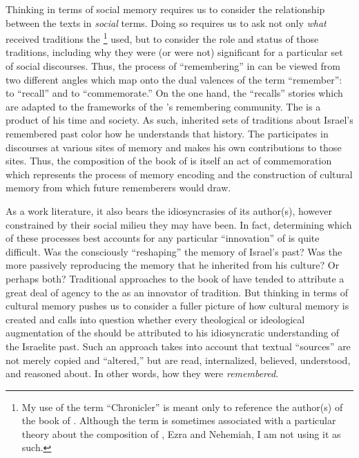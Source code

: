 Thinking in terms of social memory requires us to consider the relationship between the texts in \emph{social} terms. Doing so requires us to ask not only \emph{what} received traditions the \chronicler%
    \footnote{My use of the term ``Chronicler'' is meant only to reference the author(s) of the book of \chronicles. Although the term is sometimes associated with a particular theory about the composition of \chronicles, Ezra and Nehemiah, I am not using it as such.}
used, but to consider the role and status of those traditions, including why they were (or were not) significant for a particular set of social discourses. Thus, the process of ``remembering'' in \chronicles can be viewed from two different angles which map onto the dual valences of the term ``remember'': to ``recall'' and to ``commemorate.'' On the one hand, the \chronicler ``recalls'' stories which are adapted to the frameworks of the \chronicler's remembering community. The \chronicler is a product of his time and society. As such, inherited sets of traditions about Israel's remembered past color how he understands that history. The \chronicler participates in discourses at various sites of memory and makes his own contributions to those sites. Thus, the composition of the book of \chronicles is itself an act of commemoration which represents the process of memory encoding and the construction of cultural memory from which future rememberers would draw.

As a work literature, it also bears the idiosyncrasies of its author(s), however constrained by their social milieu they may have been. In fact, determining which of these processes best accounts for any particular ``innovation'' of \chronicles is quite difficult. Was the \chronicler consciously ``reshaping'' the memory of Israel's past? Was the \chronicler more passively reproducing the memory that he inherited from his culture? Or perhaps both? Traditional approaches to the book of \chronicles have tended to attribute a great deal of agency to the \chronicler as an innovator of tradition. But thinking in terms of cultural memory pushes us to consider a fuller picture of how cultural memory is created and calls into question whether every theological or ideological augmentation of the \chronicler should be attributed to his idiosyncratic understanding of the Israelite past. Such an approach takes into account that textual ``sources'' are not merely copied and ``altered,'' but are read, internalized, believed, understood, and reasoned about. In other words, how they were \emph{remembered}.

